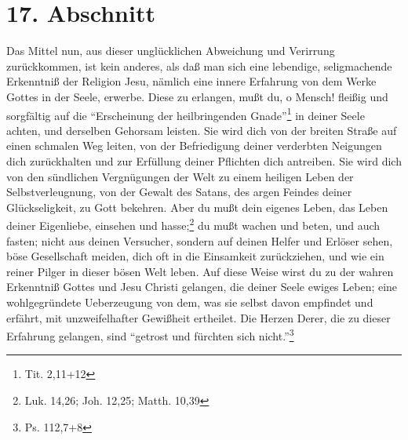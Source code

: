 \section{17. Abschnitt}

Das Mittel nun, aus dieser unglücklichen Abweichung und Verirrung zurückkommen, ist kein anderes, als daß man sich eine lebendige, seligmachende Erkenntniß der Religion Jesu, nämlich eine innere Erfahrung von dem Werke Gottes in der Seele, erwerbe. Diese zu erlangen, mußt du, o Mensch! fleißig und sorgfältig auf die "`Erscheinung der heilbringenden Gnade"'\footnote{Tit. 2,11+12} in deiner Seele achten, und derselben Gehorsam leisten. Sie wird dich von der breiten Straße auf einen schmalen Weg leiten, von der Befriedigung deiner verderbten Neigungen dich zurückhalten und zur Erfüllung deiner Pflichten dich antreiben. Sie wird dich von den sündlichen Vergnügungen der Welt zu einem heiligen Leben der Selbstverleugnung, von der Gewalt des Satans, des argen Feindes deiner Glückseligkeit, zu Gott bekehren. Aber du mußt dein eigenes Leben, das Leben deiner Eigenliebe, einsehen und hasse;\footnote{Luk. 14,26; Joh. 12,25; Matth. 10,39} du mußt wachen und beten, und auch fasten; nicht aus deinen Versucher, sondern auf deinen Helfer und Erlöser sehen, böse Gesellschaft meiden, dich oft in die Einsamkeit zurückziehen, und wie ein reiner Pilger in dieser bösen Welt leben. Auf diese Weise wirst du zu der wahren Erkenntniß Gottes und Jesu Christi gelangen, die deiner Seele ewiges Leben; eine wohlgegründete Ueberzeugung von dem, was sie selbst davon empfindet und erfährt, mit unzweifelhafter Gewißheit ertheilet. Die Herzen Derer, die zu dieser Erfahrung gelangen, sind "`getrost und fürchten sich nicht."'\footnote{Ps. 112,7+8}

